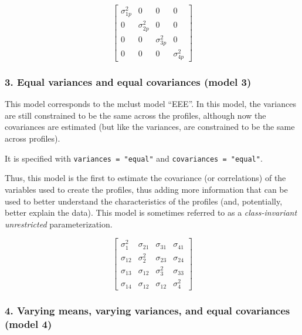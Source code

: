 \documentclass[man]{apa6}
\begin{document}
\[ 
\left[ \begin{matrix} { \sigma  }_{ 1p }^{ 2 } & 0 & 0 & 0 \\ 0 & { \sigma  }_{ 2p }^{ 2 } & 0 & 0 \\ 0 & 0 & { \sigma  }_{ 3p }^{ 2 } & 0 \\ 0 & 0 & 0 & { \sigma  }_{ 4p }^{ 2 } \end{matrix} \right] 
\]

\hypertarget{equal-variances-and-equal-covariances-model-3}{%
\subsubsection{3. Equal variances and equal covariances (model 3)}\label{equal-variances-and-equal-covariances-model-3}}

This model corresponds to the mclust model \enquote{EEE}. In this model, the variances are still constrained to be the same across the profiles, although now the covariances are estimated (but like the variances, are constrained to be the same across profiles).

It is specified with \texttt{variances\ =\ "equal"} and \texttt{covariances\ =\ "equal"}.

Thus, this model is the first to estimate the covariance (or correlations) of the variables used to create the profiles, thus adding more information that can be used to better understand the characteristics of the profiles (and, potentially, better explain the data). This model is sometimes referred to as a \emph{class-invariant unrestricted} parameterization.

\[
\left[ \begin{matrix} { \sigma  }_{ 1 }^{ 2 } & { \sigma  }_{ 21 } & { \sigma  }_{ 31 } & { \sigma  }_{ 41 } \\ { \sigma  }_{ 12 } & { \sigma  }_{ 2 }^{ 2 } & { \sigma  }_{ 23 } & { \sigma  }_{ 24 } \\ { \sigma  }_{ 13 } & { \sigma  }_{ 12 } & { \sigma  }_{ 3 }^{ 2 } & { \sigma  }_{ 33 } \\ { \sigma  }_{ 14 } & { \sigma  }_{ 12 } & { \sigma  }_{ 12 } & { \sigma  }_{ 4 }^{ 2 } \end{matrix} \right] 
\]

\hypertarget{varying-means-varying-variances-and-equal-covariances-model-4}{%
\subsubsection{4. Varying means, varying variances, and equal covariances (model 4)}\label{varying-means-varying-variances-and-equal-covariances-model-4}}
\end{document}

